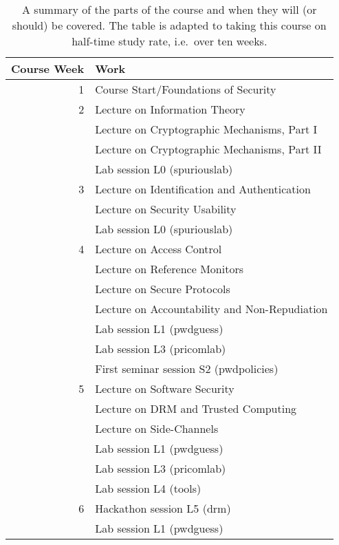\begin{table}
	\centering
  \caption{%
    A summary of the parts of the course and when they will (or should) be 
    covered.
    The table is adapted to taking this course on half-time study rate, i.e.\ 
    over ten weeks.
  }\label{TimeTable}
  \begin{tabular}{rp{9cm}}
    \toprule
    \textbf{Course Week}	& \textbf{Work} \\
    \midrule
    1
      & Course Start/Foundations of Security\\
    \midrule
    2
      & Lecture on Information Theory\\
      & Lecture on Cryptographic Mechanisms, Part I\\
      & Lecture on Cryptographic Mechanisms, Part II\\
      & Lab session L0 (spuriouslab)\\
    \midrule
    3
      & Lecture on Identification and Authentication\\
      & Lecture on Security Usability\\
      & Lab session L0 (spuriouslab)\\
    \midrule
    4
      & Lecture on Access Control\\
      & Lecture on Reference Monitors\\
      & Lecture on Secure Protocols\\
      & Lecture on Accountability and Non-Repudiation\\
      & Lab session L1 (pwdguess)\\
      & Lab session L3 (pricomlab)\\
      & First seminar session S2 (pwdpolicies)\\
    \midrule
    5
      & Lecture on Software Security\\
      & Lecture on DRM and Trusted Computing\\
      & Lecture on Side-Channels\\
      & Lab session L1 (pwdguess)\\
      & Lab session L3 (pricomlab)\\
      & Lab session L4 (tools)\\
    \midrule
    6
      & Hackathon session L5 (drm)\\
      & Lab session L1 (pwdguess)\\

\end{tabular}
\end{table}
